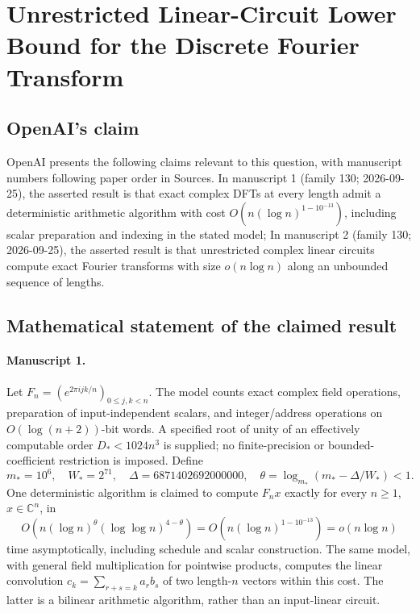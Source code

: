 \documentclass[11pt]{article}
\begin{document}
\section*{Unrestricted Linear-Circuit Lower Bound for the Discrete Fourier Transform}

\subsection{OpenAI's claim}
OpenAI presents the following claims relevant to this question, with manuscript numbers following paper order in Sources. In manuscript 1 (family 130; 2026-09-25), the asserted result is that exact complex DFTs at every length admit a deterministic arithmetic algorithm with cost $O(n(\log n)^{1-10^{-13}})$, including scalar preparation and indexing in the stated model; In manuscript 2 (family 130; 2026-09-25), the asserted result is that unrestricted complex linear circuits compute exact Fourier transforms with size $o(n\log n)$ along an unbounded sequence of lengths.

\subsection{Mathematical statement of the claimed result}
\paragraph{Manuscript 1.}
Let $F_n=(e^{2\pi i jk/n})_{0\le j,k<n}$. The model counts exact complex field operations, preparation of input-independent scalars, and integer/address operations on $O(\log(n+2))$-bit words. A specified root of unity of an effectively computable order $D_*<1024n^3$ is supplied; no finite-precision or bounded-coefficient restriction is imposed. Define
\[
 m_*=10^6,\quad W_*=2^{71},\quad\Delta=6871402692000000,\quad
 \theta=\log_{m_*}(m_*-\Delta/W_*)<1.
\]
One deterministic algorithm is claimed to compute $F_nx$ exactly for every $n\ge1$, $x\in\mathbb C^n$, in
\[
 O(n(\log n)^{\theta}(\log\log n)^{4-\theta})
 =O(n(\log n)^{1-10^{-13}})=o(n\log n)
\]
time asymptotically, including schedule and scalar construction. The same model, with general field multiplication for pointwise products, computes the linear convolution $c_k=\sum_{r+s=k}a_rb_s$ of two length-$n$ vectors within this cost. The latter is a bilinear arithmetic algorithm, rather than an input-linear circuit.
\end{document}
